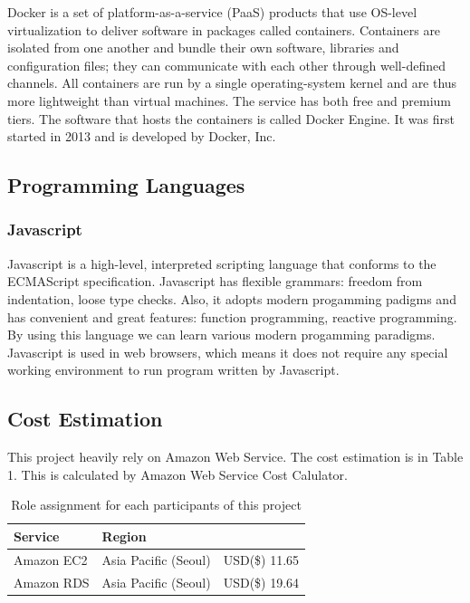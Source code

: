 \documentclass[conference,compsoc]{IEEEtran}
\begin{document}
Docker is a set of platform-as-a-service (PaaS) products that use OS-level virtualization to deliver software in packages called containers. Containers are isolated from one another and bundle their own software, libraries and configuration files; they can communicate with each other through well-defined channels. All containers are run by a single operating-system kernel and are thus more lightweight than virtual machines. The service has both free and premium tiers. The software that hosts the containers is called Docker Engine. It was first started in 2013 and is developed by Docker, Inc. 

\subsection{Programming Languages}

\subsubsection{Javascript}

Javascript is a high-level, interpreted scripting language that conforms to the ECMAScript specification. Javascript has flexible grammars: freedom from indentation, loose type checks. Also, it adopts modern progamming padigms and has convenient and great features: function programming, reactive programming. By using this language we can learn various modern progamming paradigms. Javascript is used in web browsers, which means it does not require any special working environment to run program written by Javascript.

\subsection{Cost Estimation}

This project heavily rely on Amazon Web Service. The cost estimation is in Table 1. This is calculated by Amazon Web Service Cost Calulator.

\begin{table}[ht!] \renewcommand\arraystretch{1.25}
  \begin{threeparttable}
      \caption{Role assignment for each participants of this project%
      \label{tab:table1}}    %
      \begin{tabular}{@{}l l>{\raggedright\arraybackslash}p{3.8cm}@{}}
      \toprule
      \bfseries Service & \bfseries Region & \multicolumn{1}{l}{\bfseries Cost(Monthly)} \\
      \midrule
      Amazon EC2 & Asia Pacific (Seoul) & USD(\$) 11.65 \\
      Amazon RDS & Asia Pacific (Seoul) & USD(\$) 19.64 \\
      \bottomrule
      \end{tabular}
  \end{threeparttable}
\end{table}
\end{document}

